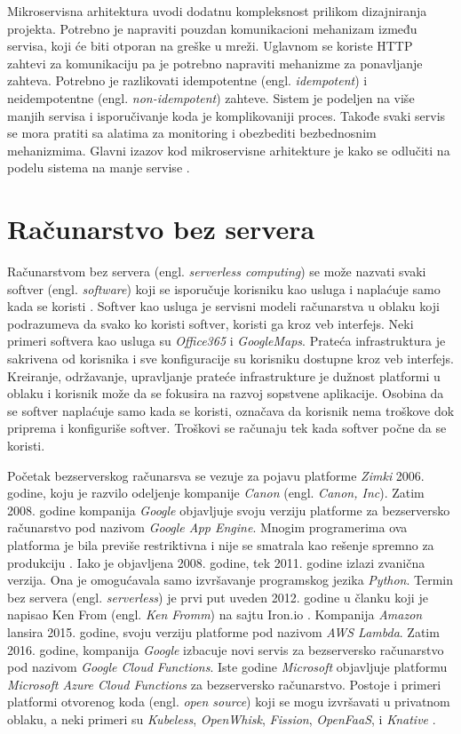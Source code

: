 \documentclass[12pt,oneside]{memoir}
\begin{document}
Mikroservisna arhitektura uvodi dodatnu kompleksnost prilikom dizajniranja projekta. Potrebno je napraviti pouzdan komunikacioni mehanizam između servisa, koji će biti otporan na greške u mreži. Uglavnom se koriste HTTP zahtevi za komunikaciju pa je potrebno napraviti mehanizme za ponavljanje zahteva. Potrebno je razlikovati idempotentne (engl. \emph{idempotent}) i neidempotentne (engl. \emph{non-idempotent}) zahteve. Sistem je podeljen na više manjih servisa i isporučivanje koda je komplikovaniji proces. Takođe svaki servis se mora pratiti sa alatima za monitoring i obezbediti bezbednosnim mehanizmima. Glavni izazov kod mikroservisne arhitekture je kako se odlučiti na podelu sistema na manje servise \cite{bm}.


\chapter{Računarstvo bez servera}
\label{chp:razrada}

Računarstvom bez servera (engl. \emph{serverless computing}) se može nazvati svaki softver (engl. \emph{software}) koji se isporučuje korisniku kao usluga i naplaćuje samo kada se koristi \cite{sa}. Softver kao usluga je servisni modeli računarstva u oblaku koji podrazumeva da svako ko koristi softver, koristi ga kroz veb interfejs. Neki primeri softvera kao usluga su \emph{Office365} i \emph{GoogleMaps}. Prateća infrastruktura je sakrivena od korisnika i sve konfiguracije su korisniku dostupne kroz veb interfejs. Kreiranje, održavanje, upravljanje prateće infrastrukture je dužnost platformi u oblaku i korisnik može da se fokusira na razvoj sopstvene aplikacije. Osobina da se softver naplaćuje samo kada se koristi, označava da korisnik nema troškove dok priprema i konfiguriše softver. Troškovi se računaju tek kada softver počne da se koristi.

Početak bezserverskog računarsva se vezuje za pojavu platforme \emph{Zimki} 2006. godine, koju je razvilo odeljenje kompanije \emph{Canon} (engl. \emph{Canon, Inc}). Zatim 2008. godine kompanija \emph{Google} objavljuje svoju verziju platforme za bezserversko računarstvo pod nazivom \emph{Google App Engine}. Mnogim programerima ova platforma je bila previše restriktivna i nije se smatrala kao rešenje spremno za produkciju \cite{ls}. Iako je objavljena 2008. godine, tek 2011. godine izlazi zvanična verzija. Ona je omogućavala samo izvršavanje programskog jezika \emph{Python}. Termin bez servera (engl. \emph{serverless}) je prvi put uveden 2012. godine u članku koji je napisao Ken From (engl. \emph{Ken Fromm}) na sajtu Iron.io \cite{wtfosaais}. Kompanija \emph{Amazon} lansira 2015. godine, svoju verziju platforme pod nazivom \emph{AWS Lambda}. Zatim 2016. godine, kompanija \emph{Google} izbacuje novi servis za bezserversko računarstvo pod nazivom \emph{Google Cloud Functions}. Iste godine \emph{Microsoft} objavljuje platformu \emph{Microsoft Azure Cloud Functions} za bezserversko računarstvo. Postoje i primeri platformi otvorenog koda (engl. \emph{open source}) koji se mogu izvršavati u privatnom oblaku, a neki primeri su \emph{Kubeless}, \emph{OpenWhisk}, \emph{Fission}, \emph{OpenFaaS}, i \emph{Knative} \cite{ws}.
\end{document}
